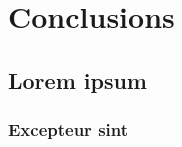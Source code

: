 \documentclass{./llncs2e/llncs}
\begin{document}

% 
% 

\section{Conclusions}

\subsection{Lorem ipsum}

\subsubsection{Excepteur sint}










% 
% 




% 
% 

 

\end{document}
